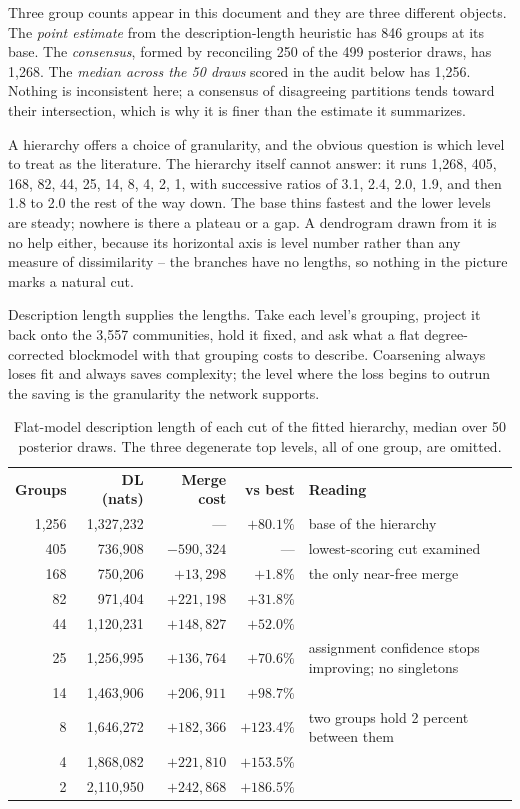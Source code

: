 \documentclass[11pt]{article}
\newcommand{\doublerule}{%
  \specialrule{0.5pt}{-1pt}{1pt}%
  \specialrule{0.5pt}{0pt}{1pt}}
\begin{document}
Three group counts appear in this document and they are three different
objects. The \emph{point estimate} from the description-length heuristic has
846 groups at its base. The \emph{consensus}, formed by reconciling 250 of the
499 posterior draws, has 1{,}268. The \emph{median across the 50 draws} scored in
the audit below has 1{,}256. Nothing is inconsistent here; a consensus of
disagreeing partitions tends toward their intersection, which is why it is
finer than the estimate it summarizes.

A hierarchy offers a choice of granularity, and the obvious question is which
level to treat as the literature. The hierarchy itself cannot answer: it runs
1{,}268, 405, 168, 82, 44, 25, 14, 8, 4, 2, 1, with successive ratios of 3.1,
2.4, 2.0, 1.9, and then 1.8 to 2.0 the rest of the way down. The base thins
fastest and the lower levels are steady; nowhere is there a plateau or a
gap. A dendrogram
drawn from it is no help either, because its horizontal axis is level number
rather than any measure of dissimilarity -- the branches have no lengths, so
nothing in the picture marks a natural cut.

Description length supplies the lengths. Take each level's grouping, project it
back onto the 3{,}557 communities, hold it fixed, and ask what a flat
degree-corrected blockmodel with that grouping costs to describe. Coarsening
always loses fit and always saves complexity; the level where the loss begins to
outrun the saving is the granularity the network supports.

\begin{table}[!t]
\centering
\setlength{\tabcolsep}{4.5pt}
\caption{Flat-model description length of each cut of the fitted hierarchy,
  median over 50 posterior draws. The three degenerate top levels, all of one
  group, are omitted.}
\label{tab:entropy}
\begin{tabular}{@{}rrrrP{5.4cm}@{}}
\toprule
\textbf{Groups} & \textbf{DL (nats)} & \textbf{Merge cost} & \textbf{vs best}
  & \textbf{Reading}\\
\doublerule
1{,}256 & 1{,}327{,}232 & --- & $+80.1\%$
  & base of the hierarchy\\
405 & 736{,}908 & $-590{,}324$ & --- & lowest-scoring cut examined\\
168 & 750{,}206 & $+13{,}298$ & $+1.8\%$
  & the only near-free merge\\
82 & 971{,}404 & $+221{,}198$ & $+31.8\%$ & \\
44 & 1{,}120{,}231 & $+148{,}827$ & $+52.0\%$ & \\
25 & 1{,}256{,}995 & $+136{,}764$ & $+70.6\%$
  & assignment confidence stops improving; no singletons\\
14 & 1{,}463{,}906 & $+206{,}911$ & $+98.7\%$ & \\
8 & 1{,}646{,}272 & $+182{,}366$ & $+123.4\%$
  & two groups hold 2 percent between them\\
4 & 1{,}868{,}082 & $+221{,}810$ & $+153.5\%$ & \\
2 & 2{,}110{,}950 & $+242{,}868$ & $+186.5\%$ & \\
\bottomrule
\end{tabular}
\end{table}
\end{document}
